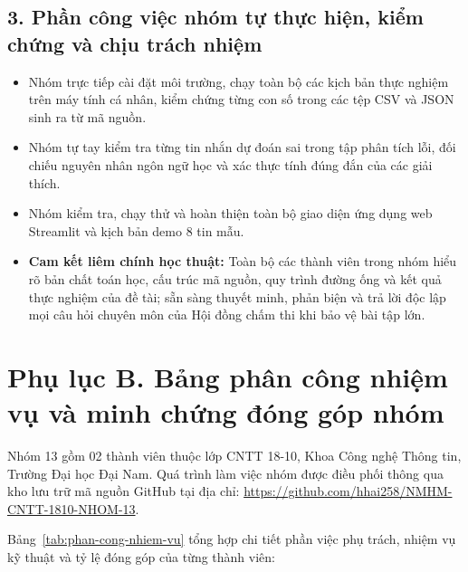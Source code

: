 \subsection*{3. Phần công việc nhóm tự thực hiện, kiểm chứng và chịu trách nhiệm}
\begin{itemize}
    \item Nhóm trực tiếp cài đặt môi trường, chạy toàn bộ các kịch bản thực nghiệm trên máy tính cá nhân, kiểm chứng từng con số trong các tệp CSV và JSON sinh ra từ mã nguồn.
    \item Nhóm tự tay kiểm tra từng tin nhắn dự đoán sai trong tập phân tích lỗi, đối chiếu nguyên nhân ngôn ngữ học và xác thực tính đúng đắn của các giải thích.
    \item Nhóm kiểm tra, chạy thử và hoàn thiện toàn bộ giao diện ứng dụng web Streamlit và kịch bản demo 8 tin mẫu.
    \item \textbf{Cam kết liêm chính học thuật:} Toàn bộ các thành viên trong nhóm hiểu rõ bản chất toán học, cấu trúc mã nguồn, quy trình đường ống và kết quả thực nghiệm của đề tài; sẵn sàng thuyết minh, phản biện và trả lời độc lập mọi câu hỏi chuyên môn của Hội đồng chấm thi khi bảo vệ bài tập lớn.
\end{itemize}

\clearpage

\section*{Phụ lục B. Bảng phân công nhiệm vụ và minh chứng đóng góp nhóm}

Nhóm 13 gồm 02 thành viên thuộc lớp CNTT 18-10, Khoa Công nghệ Thông tin, Trường Đại học Đại Nam. Quá trình làm việc nhóm được điều phối thông qua kho lưu trữ mã nguồn GitHub tại địa chỉ: \url{https://github.com/hhai258/NMHM-CNTT-1810-NHOM-13}.

Bảng~\ref{tab:phan-cong-nhiem-vu} tổng hợp chi tiết phần việc phụ trách, nhiệm vụ kỹ thuật và tỷ lệ đóng góp của từng thành viên:

